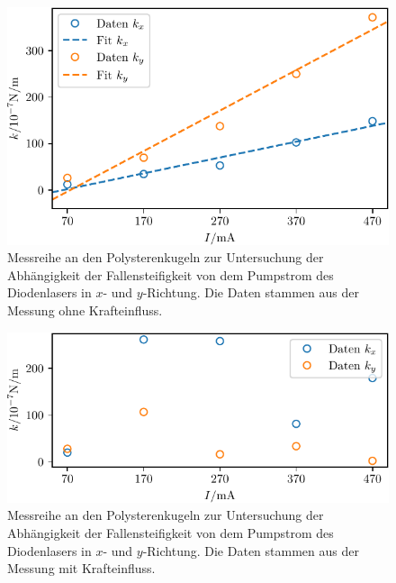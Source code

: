 \begin{figure}
  \centering
  \includegraphics[scale = 1]{../analysis/data/ii_polysteren/k_power_series.pdf}
  \caption{Messreihe an den Polysterenkugeln zur Untersuchung der Abhängigkeit der Fallensteifigkeit von dem Pumpstrom des Diodenlasers
  in $x$- und $y$-Richtung. Die Daten stammen aus der Messung ohne Krafteinfluss.}
  \label{fig: poly_k_power}
\end{figure}
\begin{figure}
  \centering
  \includegraphics[scale = 1]{../analysis/data/ii_polysteren/k_power_series_force.pdf}
  \caption{Messreihe an den Polysterenkugeln zur Untersuchung der Abhängigkeit der Fallensteifigkeit von dem Pumpstrom des Diodenlasers
  in $x$- und $y$-Richtung. Die Daten stammen aus der Messung mit Krafteinfluss. }
  \label{fig: poly_k_power_series_force}
\end{figure}

\FloatBarrier

